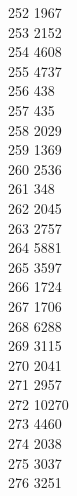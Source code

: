 { 252	1967 \\
 253	2152 \\
 254	4608 \\
 255	4737 \\
 256	438 \\
 257	435 \\
 258	2029 \\
 259	1369 \\
 260	2536 \\
 261	348 \\
 262	2045 \\
 263	2757 \\
 264	5881 \\
 265	3597 \\
 266	1724 \\
 267	1706 \\
 268	6288 \\
 269	3115 \\
 270	2041 \\
 271	2957 \\
 272	10270 \\
 273	4460 \\
 274	2038 \\
 275	3037 \\
 276	3251 \\
}
